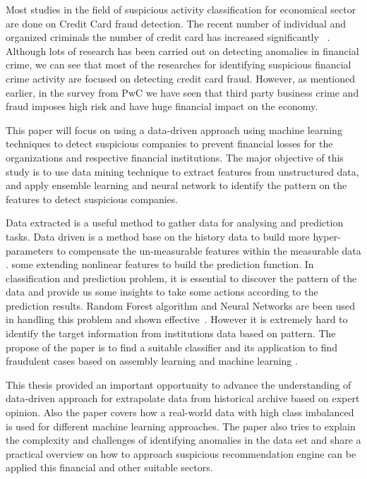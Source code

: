 Most studies in the field of suspicious activity classification for economical sector are done on Credit Card fraud detection. The recent number of individual and organized criminals the number of credit card has increased significantly ~\cite{RB2021}. Although lots of research has been carried out on detecting anomalies in financial crime, we can see that most of the researches for identifying suspicious financial crime activity are focused on detecting credit card fraud. However, as mentioned earlier, in the survey from PwC we have seen that third party business crime and fraud imposes high risk and have huge financial impact on the economy.


This paper will focus on using a data-driven approach using machine learning techniques to detect suspicious companies to prevent financial losses for the organizations and respective financial institutions.  The major objective of this study is to use data mining technique to extract features from unstructured data, and apply ensemble learning and neural network to identify the pattern on the features to detect suspicious companies.




Data extracted is a useful method to gather data for analysing and prediction tasks. Data driven is a method base on the history data to build more hyper-parameters to compensate the un-measurable features within the measurable data \cite{SMARRA20181252}. some extending nonlinear features to build the prediction function. In classification and prediction problem, it is essential to discover the pattern of the data and provide us some insights to take some actions according to the prediction results. Random Forest algorithm and Neural Networks are been used in handling this problem and shown effective~\cite{10.1145/3414274.3414278, RB2021}. However it is extremely hard to identify the target information from institutions data based on pattern. The propose of the paper is to find a suitable classifier and its application to find fraudulent cases based on assembly learning and machine learning .






This thesis provided an important opportunity to advance the understanding of data-driven approach for extrapolate data from historical archive based on expert opinion. Also the paper covers how a real-world data with high class imbalanced is used for different machine learning approaches. The paper also tries to explain the complexity and challenges of identifying anomalies in the data set and share a practical overview on how to approach suspicious recommendation engine can be applied this financial and other suitable sectors.



